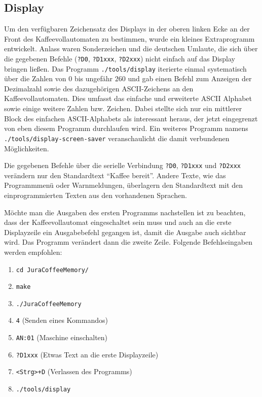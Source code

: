 \subsection{Display}
Um den verfügbaren Zeichensatz des Displays in der oberen linken Ecke an der Front des Kaffeevollautomaten zu bestimmen, wurde ein kleines Extraprogramm entwickelt.
Anlass waren Sonderzeichen und die deutschen Umlaute, die sich über die gegebenen Befehle (\texttt{?D0}, \texttt{?D1xxx}, \texttt{?D2xxx}) nicht einfach auf das Display bringen ließen.
Das Programm \texttt{./tools/display} iterierte einmal systematisch über die Zahlen von $0$ bis ungefähr $260$ und gab einen Befehl zum Anzeigen der Dezimalzahl sowie des dazugehörigen \ac{ASCII}-Zeichens an den Kaffeevollautomaten.
Dies umfasst das einfache und erweiterte \ac{ASCII} Alphabet sowie einige weitere Zahlen bzw. Zeichen.
Dabei stellte sich nur ein mittlerer Block des einfachen \ac{ASCII}-Alphabets als interessant heraus, der jetzt eingegrenzt von eben diesem Programm durchlaufen wird.
Ein weiteres Programm namens \texttt{./tools/display-screen-saver} veranschaulicht die damit verbundenen Möglichkeiten.

Die gegebenen Befehle über die serielle Verbindung \texttt{?D0}, \texttt{?D1xxx} und \texttt{?D2xxx} verändern nur den Standardtext "`Kaffee bereit"'.
Andere Texte, wie das Programmmenü oder Warnmeldungen, überlagern den Standardtext mit den einprogrammierten Texten aus den vorhandenen Sprachen.

Möchte man die Ausgaben des ersten Programms nachstellen ist zu beachten, dass der Kaffeevollautomat eingeschaltet sein muss und auch an die erste Displayzeile ein Ausgabebefehl gegangen ist, damit die Ausgabe auch sichtbar wird.
Das Programm verändert dann die zweite Zeile.
Folgende Befehlseingaben werden empfohlen:
\begin{enumerate}
  \item \texttt{cd JuraCoffeeMemory/}
  \item \texttt{make}
  \item \texttt{./JuraCoffeeMemory}
  \item \texttt{4} (Senden eines Kommandos)
  \item \texttt{AN:01} (Maschine einschalten)
  \item \texttt{?D1xxx} (Etwas Text an die erste Displayzeile)
  \item \texttt{<Strg>+D} (Verlassen des Programms)
  \item \texttt{./tools/display}
\end{enumerate}

